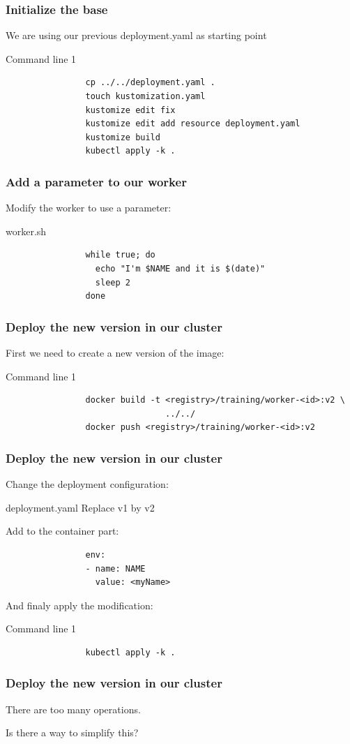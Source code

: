 	\begin{frame}[fragile]
		\frametitle{Initialize the base}
		
		We are using our previous deployment.yaml as starting point
		\begin{block}{Command line 1}
			\begin{verbatim}
				cp ../../deployment.yaml .
				touch kustomization.yaml
				kustomize edit fix
				kustomize edit add resource deployment.yaml
				kustomize build
				kubectl apply -k .
			\end{verbatim}
		\end{block}
	\end{frame}
	
	\begin{frame}[fragile]
		\frametitle{Add a parameter to our worker}
		
		Modify the worker to use a parameter:
		\begin{block}{worker.sh}
			\begin{verbatim}
				while true; do
				  echo "I'm $NAME and it is $(date)"
				  sleep 2
				done
			\end{verbatim}
		\end{block}
	\end{frame}
	
	\begin{frame}[fragile]
		\frametitle{Deploy the new version in our cluster}
		
		First we need to create a new version of the image:
		\begin{block}{Command line 1}
			\begin{verbatim}
				docker build -t <registry>/training/worker-<id>:v2 \
				                ../../
				docker push <registry>/training/worker-<id>:v2
			\end{verbatim}
		\end{block}
	\end{frame}
	
	\begin{frame}[fragile]
		\frametitle{Deploy the new version in our cluster}
		
		Change the deployment configuration:
		\begin{block}{deployment.yaml}
			Replace v1 by v2
			
			Add to the container part:
			\begin{verbatim}
				env:
				- name: NAME
				  value: <myName>
			\end{verbatim}
		\end{block}
		
		And finaly apply the modification:
		\begin{block}{Command line 1}
			\begin{verbatim}
				kubectl apply -k .
			\end{verbatim}
		\end{block}
	\end{frame}
	
	\begin{frame}
		\frametitle{Deploy the new version in our cluster}
		
		There are too many operations.
		
		\bigskip
		Is there a way to simplify this?
	\end{frame}
